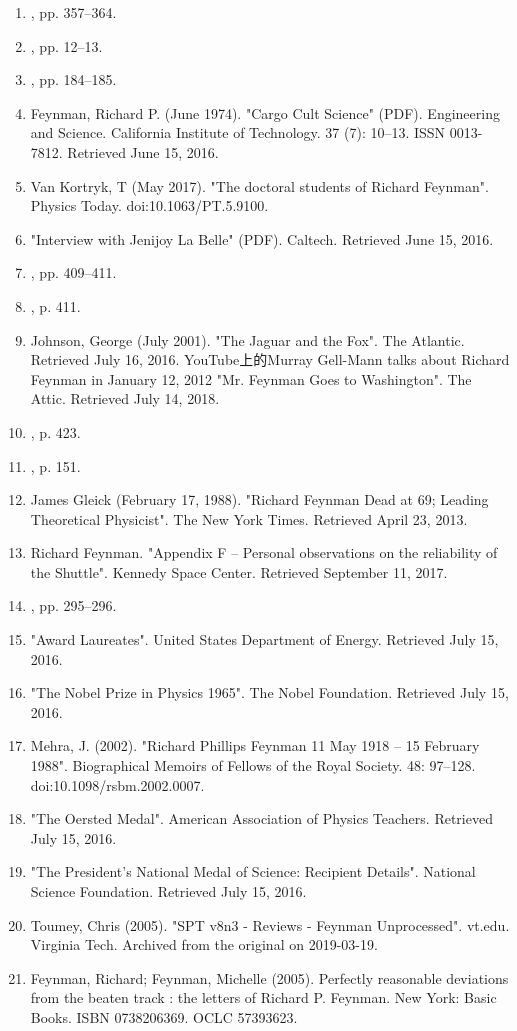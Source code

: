 \begin{enumerate}
\item , pp. 357–364.
\item , pp. 12–13.
\item , pp. 184–185.
\item Feynman, Richard P. (June 1974). "Cargo Cult Science" (PDF). Engineering and Science. California Institute of Technology. 37 (7): 10–13. ISSN 0013-7812. Retrieved June 15, 2016.
\item Van Kortryk, T (May 2017). "The doctoral students of Richard Feynman". Physics Today. doi:10.1063/PT.5.9100.
\item "Interview with Jenijoy La Belle" (PDF). Caltech. Retrieved June 15, 2016.
\item , pp. 409–411.
\item , p. 411.
\item Johnson, George (July 2001). "The Jaguar and the Fox". The Atlantic. Retrieved July 16, 2016.
YouTube上的Murray Gell-Mann talks about Richard Feynman in January 12, 2012
"Mr. Feynman Goes to Washington". The Attic. Retrieved July 14, 2018.
\item , p. 423.
\item , p. 151.
\item James Gleick (February 17, 1988). "Richard Feynman Dead at 69; Leading Theoretical Physicist". The New York Times. Retrieved April 23, 2013.
\item Richard Feynman. "Appendix F – Personal observations on the reliability of the Shuttle". Kennedy Space Center. Retrieved September 11, 2017.
\item , pp. 295–296.
\item "Award Laureates". United States Department of Energy. Retrieved July 15, 2016.
\item "The Nobel Prize in Physics 1965". The Nobel Foundation. Retrieved July 15, 2016.
\item Mehra, J. (2002). "Richard Phillips Feynman 11 May 1918 – 15 February 1988". Biographical Memoirs of Fellows of the Royal Society. 48: 97–128. doi:10.1098/rsbm.2002.0007.
\item "The Oersted Medal". American Association of Physics Teachers. Retrieved July 15, 2016.
\item "The President's National Medal of Science: Recipient Details". National Science Foundation. Retrieved July 15, 2016.
\item Toumey, Chris (2005). "SPT v8n3 - Reviews - Feynman Unprocessed". vt.edu. Virginia Tech. Archived from the original on 2019-03-19.
\item Feynman, Richard; Feynman, Michelle (2005). Perfectly reasonable deviations from the beaten track : the letters of Richard P. Feynman. New York: Basic Books. ISBN 0738206369. OCLC 57393623.

\end{enumerate}
